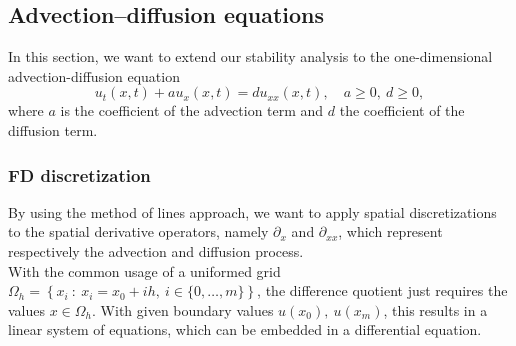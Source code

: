 \subsection{Advection--diffusion equations}
\label{sec: advection_diffusion}
In this section, we want to extend our stability analysis to the one-dimensional advection-diffusion equation
\begin{equation}\label{eq: A-D_equation}
u_t(x,t) + au_x(x,t) = du_{xx}(x,t), \quad a\ge0, \ d \ge 0,
\end{equation}
where $a$ is the coefficient of the advection term and $d$ the coefficient of the diffusion term. 
\subsubsection{FD discretization}
\label{sec: spatial_discretization}
By using the method of lines approach, we want to apply spatial discretizations to the spatial derivative operators, namely $\partial_x$ and $\partial_{xx}$, which represent respectively the advection and diffusion process. \\
With the common usage of a uniformed grid $\Omega_h=\left\{x_i \ : \ x_i = x_0 + ih, \ i \in \{0,\hdots , m\}\right\}$, the difference quotient just requires the values $x \in \Omega_h$. With given boundary values $u(x_0), \ u(x_m)$, this results in a linear system of equations, which can be embedded in a differential equation. 

